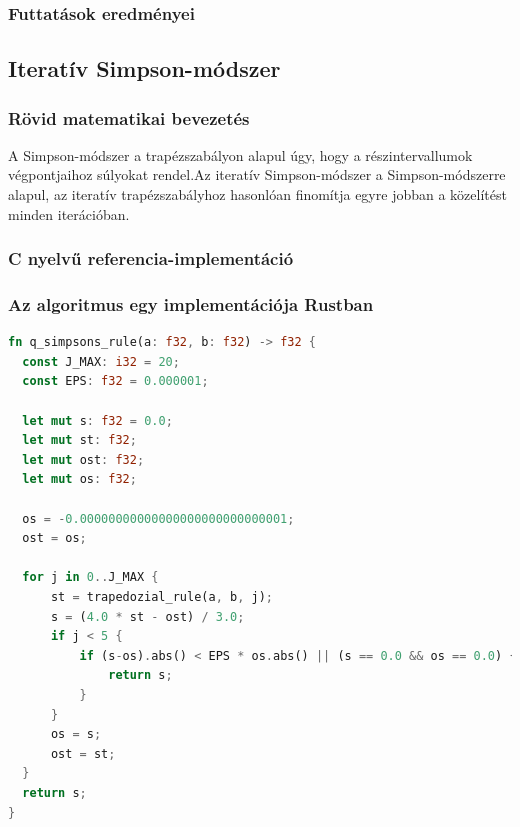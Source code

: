 \subsubsection{Futtatások eredményei} %

\subsection{Iteratív Simpson-módszer}
\subsubsection{Rövid matematikai bevezetés}
A Simpson-módszer a trapézszabályon alapul úgy, hogy a részintervallumok végpontjaihoz súlyokat rendel.Az iteratív Simpson-módszer a Simpson-módszerre alapul, az iteratív trapézszabályhoz hasonlóan finomítja egyre jobban a közelítést minden iterációban.
\subsubsection{C nyelvű referencia-implementáció}
\subsubsection{Az algoritmus egy implementációja Rustban}
\begin{lstlisting}[language=Rust]
fn q_simpsons_rule(a: f32, b: f32) -> f32 {
  const J_MAX: i32 = 20;
  const EPS: f32 = 0.000001;
	  
  let mut s: f32 = 0.0;
  let mut st: f32;
  let mut ost: f32;
  let mut os: f32;
  
  os = -0.00000000000000000000000000001;
  ost = os;
  
  for j in 0..J_MAX {
	  st = trapedozial_rule(a, b, j);
	  s = (4.0 * st - ost) / 3.0;
	  if j < 5 {
		  if (s-os).abs() < EPS * os.abs() || (s == 0.0 && os == 0.0) {
			  return s;
		  }
	  }
	  os = s;
	  ost = st;
  }
  return s;
}
\end{lstlisting}
